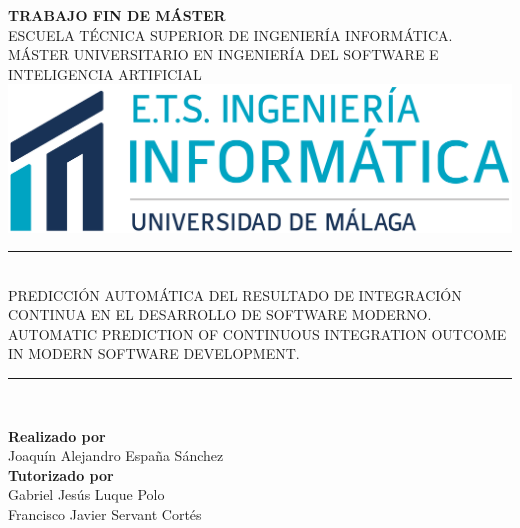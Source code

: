 \begin{titlepage}
\newlength{\centeroffset}
\setlength{\centeroffset}{-0.5\oddsidemargin}
\addtolength{\centeroffset}{0.5\evensidemargin}
\thispagestyle{empty}


\noindent\hspace*{-0.1\textwidth}
\begin{minipage}{1.2\textwidth}

\centering
\textbf{\Large TRABAJO FIN DE MÁSTER}\\[1cm]
\textsc{ESCUELA TÉCNICA SUPERIOR DE INGENIERÍA INFORMÁTICA.}\\[0.5cm]
\textsc{MÁSTER UNIVERSITARIO EN INGENIERÍA DEL SOFTWARE E INTELIGENCIA ARTIFICIAL}\\[0.5cm]

\includegraphics[width=1\textwidth]{logos/COLOR_TRANSPARENTE_INFORMATICA.png}\\[0.5cm]

\noindent\rule[-1ex]{\textwidth}{1pt}\\
\textsc{PREDICCIÓN AUTOMÁTICA DEL RESULTADO DE INTEGRACIÓN CONTINUA EN EL DESARROLLO DE SOFTWARE MODERNO.}\\[0.5cm]

\textsc{AUTOMATIC PREDICTION OF CONTINUOUS INTEGRATION OUTCOME IN MODERN SOFTWARE DEVELOPMENT.}\\
\vspace{-2.5ex}
\noindent\rule[-1ex]{\textwidth}{1pt}\\

\end{minipage}

\vspace{0.8cm}
\noindent\hspace*{\centeroffset}
\begin{minipage}{\textwidth}

\centering
\textbf{Realizado por}\\ {Joaquín Alejandro España Sánchez}\\[2.5ex]
\textbf{Tutorizado por}\\ {Gabriel Jesús Luque Polo}\\ {Francisco Javier Servant Cortés}\\[1cm]


\end{minipage}
\end{titlepage}
